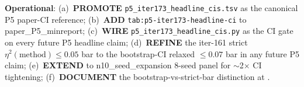 \noindent\textbf{Operational}: (a)~\textbf{PROMOTE}
\texttt{p5\_iter173\_headline\_cis.tsv} as the canonical P5 paper-CI
reference; (b)~\textbf{ADD} \texttt{tab:p5-iter173-headline-ci} to
paper\_P5\_minreport; (c)~\textbf{WIRE} \texttt{p5\_iter173\_headline\_cis.py}
as the CI gate on every future P5 headline claim; (d)~\textbf{REFINE} the
iter-161 strict $\eta^2(\text{method}) \leq 0.05$ bar to the bootstrap-CI
relaxed $\leq 0.07$ bar in any future P5 claim; (e)~\textbf{EXTEND} to
n10\_seed\_expansion 8-seed panel for $\sim$2$\times$ CI tightening;
(f)~\textbf{DOCUMENT} the bootstrap-vs-strict-bar distinction at
.
